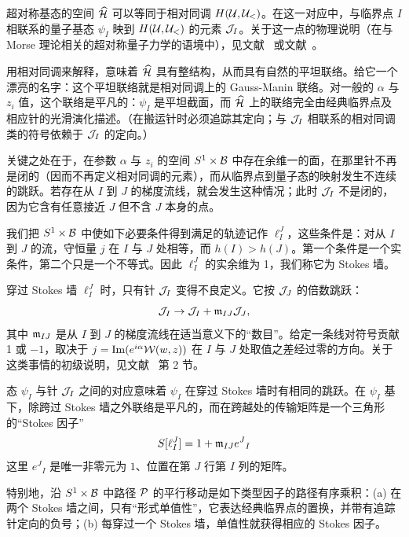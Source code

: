 超对称基态的空间 $\hat\H$ 可以等同于相对同调 $H(\U,\U_<)$。在这一对应中，与临界点 $I$ 相联系的量子基态 $\psi_I$ 映到 $H(\U,\U_<)$ 的元素 $\J_I$。关于这一点的物理说明（在与 Morse 理论相关的超对称量子力学的语境中），见文献~\cite{FLN} 或文献~\cite{NewLook}。

用相对同调来解释，意味着 $\hat\H$ 具有整结构，从而具有自然的平坦联络。给它一个漂亮的名字：这个平坦联络就是相对同调上的 Gauss-Manin 联络。对一般的 $\alpha$ 与 $z_i$ 值，这个联络是平凡的：$\psi_I$ 是平坦截面，而 $\hat\H$ 上的联络完全由经典临界点及相应针的光滑演化描述。（在搬运针时必须追踪其定向；与 $\J_I$ 相联系的相对同调类的符号依赖于 $\J_I$ 的定向。）

关键之处在于，在参数 $\alpha$ 与 $z_i$ 的空间 $S^1 \times \ZZ$ 中存在余维一的面，在那里针不再是闭的（因而不再定义相对同调的元素），而从临界点到量子态的映射发生不连续的跳跃。若存在从 $I$ 到 $J$ 的梯度流线，就会发生这种情况；此时 $\J_I$ 不是闭的，因为它含有任意接近 $J$ 但不含 $J$ 本身的点。

我们把 $S^1\times \ZZ$ 中使如下必要条件得到满足的轨迹记作 $\ell_I^J$，这些条件是：对从 $I$ 到 $J$ 的流，守恒量 $j$ 在 $I$ 与 $J$ 处相等，而 $h(I)>h(J)$。第一个条件是一个实条件，第二个只是一个不等式。因此 $\ell_I^J$ 的实余维为 1，我们称它为 Stokes 墙。

穿过 Stokes 墙 $\ell_I^J$ 时，只有针 $\J_I$ 变得不良定义。它按 $\J_J$ 的倍数跳跃：
\begin{equation}\label{stokesS}
\J_I \to \J_I + \frak{m}_{IJ} \J_J,
\end{equation}
其中 $\frak{m}_{IJ}$ 是从 $I$ 到 $J$ 的梯度流线在适当意义下的“数目”。给定一条线对符号贡献 1 或 $-1$，取决于 $j=\mathrm{Im}(e^{i \alpha} \W(w,z))$ 在 $I$ 与 $J$ 处取值之差经过零的方向。关于这类事情的初级说明，见文献~\cite{Analytic} 第 2 节。

态 $\psi_I$ 与针 $\J_I$ 之间的对应意味着 $\psi_I$ 在穿过 Stokes 墙时有相同的跳跃。在 $\psi_I$ 基下，除跨过 Stokes 墙之外联络是平凡的，而在跨越处的传输矩阵是一个三角形的“Stokes 因子”
\begin{equation}\label{sf}
S[\ell_I^J] = 1 + \frak{m}_{IJ} e^J{}_I
\end{equation}
这里 $e^J{}_I$ 是唯一非零元为 $1$、位置在第 $J$ 行第 $I$ 列的矩阵。

特别地，沿 $S^1 \times \ZZ$ 中路径 $\P$ 的平行移动是如下类型因子的路径有序乘积：(a) 在两个 Stokes 墙之间，只有“形式单值性”，它表达经典临界点的置换，并带有追踪针定向的负号；(b) 每穿过一个 Stokes 墙，单值性就获得相应的 Stokes 因子。


